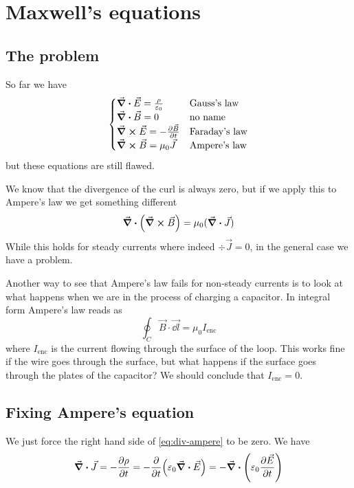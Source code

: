 \documentclass[12pt]{extarticle}
\begin{document}
\section{Maxwell's equations}

\subsection{The problem}

So far we have
\begin{equation}
	\begin{cases}
		\div \vec E = \frac{\rho}{\varepsilon_0} & \text{Gauss's law}   \\
		\div \vec B = 0                          & \text{no name}       \\
		\curl \vec E = -\pdv{\vec B}{t}          & \text{Faraday's law} \\
		\curl \vec B = \mu_0 \vec J              & \text{Ampere's law}
	\end{cases}
\end{equation}
but these equations are still flawed.

We know that the divergence of the curl is always zero, but if we apply this to Ampere's law we get something different
\begin{equation}
	\label{eq:div-ampere}
	\div (\curl \vec B) = \mu_0 (\div \vec J)
\end{equation}
While this holds for steady currents where indeed $\div \vec J = 0$,
in the general case we have a problem.

Another way to see that Ampere's law fails for non-steady currents is to look at what happens when we are in the process of charging a capacitor.
In integral form Ampere's law reads as
\begin{equation}
	\oint_C \vec B \cdot \vec{\dd l} = \mu_0 I_\text{enc}
\end{equation}
where $I_\text{enc}$ is the current flowing through the surface of the loop.
This works fine if the wire goes through the surface, but what happens if the surface goes through the plates of the capacitor?
We should conclude that $I_\text{enc} = 0$.

\subsection{Fixing Ampere's equation}

We just force the right hand side of \cref{eq:div-ampere} to be zero.
We have
\begin{equation}
	\div \vec J = - \pdv{\rho}{t} = - \pdv{t}(\varepsilon_0 \div \vec E) = - \div (\varepsilon_0 \pdv{\vec E}{t})
\end{equation}
\end{document}
